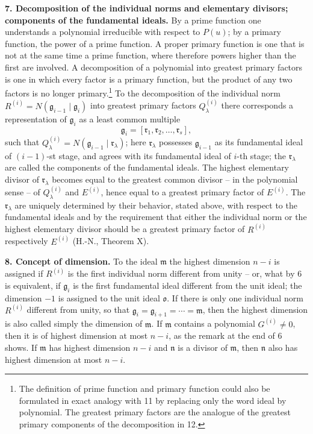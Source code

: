 \documentclass[11pt]{article}
\providecommand{\frakm}{\mathfrak m}
\providecommand{\frakn}{\mathfrak n}
\providecommand{\frakr}{\mathfrak r}
\providecommand{\frakg}{\mathfrak g}
\providecommand{\frako}{\mathfrak o}
\providecommand{\frako}{\mathfrak o}
\providecommand{\frakr}{\mathfrak r}
\begin{document}
\textbf{7. Decomposition of the individual norms and elementary divisors; components of the fundamental ideals.} By a prime function one understands a polynomial irreducible with respect to $P(u)$; by a primary function, the power of a prime function. A proper primary function is one that is not at the same time a prime function, where therefore powers higher than the first are involved. A decomposition of a polynomial into greatest primary factors is one in which every factor is a primary function, but the product of any two factors is no longer primary.\footnote{The definition of prime function and primary function could also be formulated in exact analogy with 11 by replacing only the word ideal by polynomial. The greatest primary factors are the analogue of the greatest primary components of the decomposition in 12.} To the decomposition of the individual norm $R^{(i)}=N(\frakg_{i-1}\mid\frakg_i)$ into greatest primary factors $Q_\lambda^{(i)}$ there corresponds a representation of $\frakg_i$ as a least common multiple
\[
\frakg_i=[\frakr_1,\frakr_2,\ldots,\frakr_s],
\]
such that $Q_\lambda^{(i)}=N(\frakg_{i-1}\mid\frakr_\lambda)$; here $\frakr_\lambda$ possesses $\frakg_{i-1}$ as its fundamental ideal of $(i-1)$-st stage, and agrees with its fundamental ideal of $i$-th stage; the $\frakr_\lambda$ are called the components of the fundamental ideals. The highest elementary divisor of $\frakr_\lambda$ becomes equal to the greatest common divisor -- in the polynomial sense -- of $Q_\lambda^{(i)}$ and $E^{(i)}$, hence equal to a greatest primary factor of $E^{(i)}$. The $\frakr_\lambda$ are uniquely determined by their behavior, stated above, with respect to the fundamental ideals and by the requirement that either the individual norm or the highest elementary divisor should be a greatest primary factor of $R^{(i)}$ respectively $E^{(i)}$ (H.-N., Theorem X).

\textbf{8. Concept of dimension.} To the ideal $\frakm$ the highest dimension $n-i$ is assigned if $R^{(i)}$ is the first individual norm different from unity -- or, what by 6 is equivalent, if $\frakg_i$ is the first fundamental ideal different from the unit ideal; the dimension $-1$ is assigned to the unit ideal $\frako$. If there is only one individual norm $R^{(i)}$ different from unity, so that $\frakg_i=\frakg_{i+1}=\cdots=\frakm$, then the highest dimension is also called simply the dimension of $\frakm$. If $\frakm$ contains a polynomial $G^{(i)}\ne0$, then it is of highest dimension at most $n-i$, as the remark at the end of 6 shows. If $\frakm$ has highest dimension $n-i$ and $\frakn$ is a divisor of $\frakm$, then $\frakn$ also has highest dimension at most $n-i$.
\end{document}
